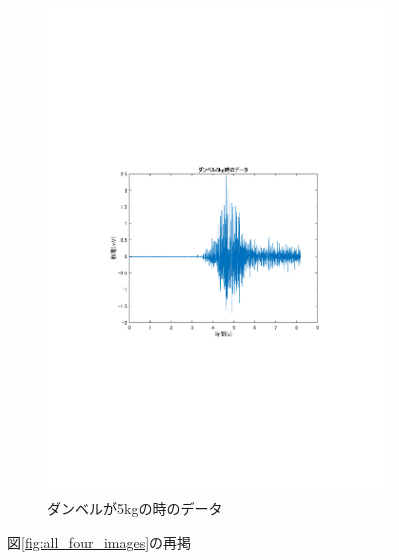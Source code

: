 \documentclass[dvipdfmx, titlepage, t]{jsarticle}
\begin{document}
\begin{figure}[H]
\begin{subfigure}[b]{0.48\linewidth}
        \includegraphics[trim=90 250 100 250 clip,width=\linewidth]{figure/data_5kg.pdf}
        \caption{ダンベルが5kgの時のデータ} %
    \end{subfigure}

    \caption{図\ref{fig:all_four_images}の再掲} %
    \label{fig:my_ans}
\end{figure}        
    
\end{document}
